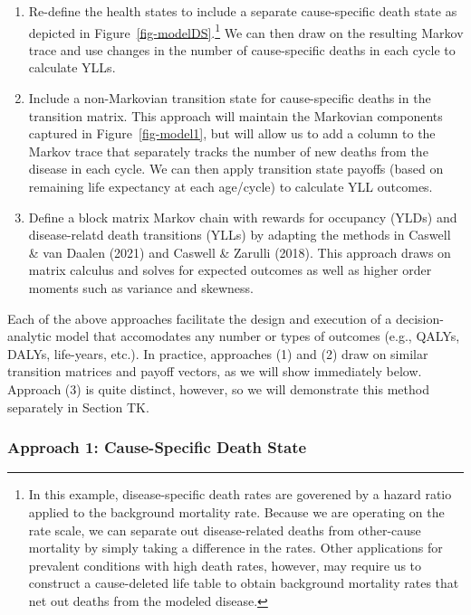 \documentclass[
]{agujournal2019}
\begin{document}
\begin{enumerate}
\def\labelenumi{\arabic{enumi}.}
\item
  Re-define the health states to include a separate cause-specific death
  state as depicted in Figure~\ref{fig-modelDS}.\footnote{In this
    example, disease-specific death rates are goverened by a hazard
    ratio applied to the background mortality rate. Because we are
    operating on the rate scale, we can separate out disease-related
    deaths from other-cause mortality by simply taking a difference in
    the rates. Other applications for prevalent conditions with high
    death rates, however, may require us to construct a cause-deleted
    life table to obtain background mortality rates that net out deaths
    from the modeled disease.} We can then draw on the resulting Markov
  trace and use changes in the number of cause-specific deaths in each
  cycle to calculate YLLs.
\item
  Include a non-Markovian transition state for cause-specific deaths in
  the transition matrix. This approach will maintain the Markovian
  components captured in Figure~\ref{fig-model1}, but will allow us to
  add a column to the Markov trace that separately tracks the number of
  new deaths from the disease in each cycle. We can then apply
  transition state payoffs (based on remaining life expectancy at each
  age/cycle) to calculate YLL outcomes.
\item
  Define a block matrix Markov chain with rewards for occupancy (YLDs)
  and disease-relatd death transitions (YLLs) by adapting the methods in
  Caswell \& van Daalen (2021) and Caswell \& Zarulli (2018). This
  approach draws on matrix calculus and solves for expected outcomes as
  well as higher order moments such as variance and skewness.
\end{enumerate}

Each of the above approaches facilitate the design and execution of a
decision-analytic model that accomodates any number or types of outcomes
(e.g., QALYs, DALYs, life-years, etc.). In practice, approaches (1) and
(2) draw on similar transition matrices and payoff vectors, as we will
show immediately below. Approach (3) is quite distinct, however, so we
will demonstrate this method separately in Section TK.

\subsubsection{Approach 1: Cause-Specific Death
State}\label{approach-1-cause-specific-death-state}
\end{document}
